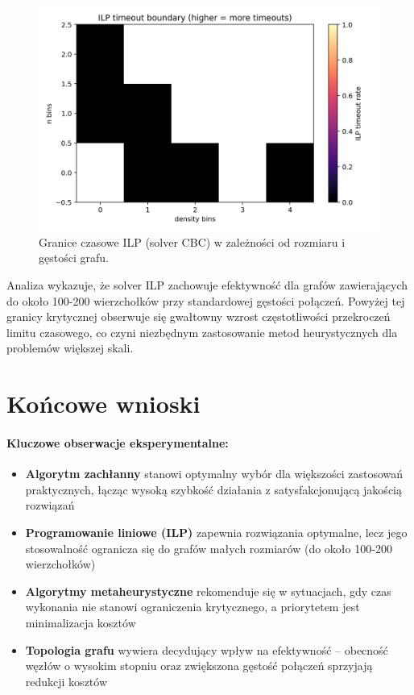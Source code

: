 \begin{figure}[H]
  \centering
  \includegraphics[width=0.7\linewidth]{assets/figures/ba_ilp_timeout_boundary.png}
  \caption{Granice czasowe ILP (solver CBC) w zależności od rozmiaru i gęstości grafu.}
  \label{fig:ilp_limits}
\end{figure}

Analiza wykazuje, że solver ILP zachowuje efektywność dla grafów zawierających do około 100-200 wierzchołków przy standardowej gęstości połączeń. Powyżej tej granicy krytycznej obserwuje się gwałtowny wzrost częstotliwości przekroczeń limitu czasowego, co czyni niezbędnym zastosowanie metod heurystycznych dla problemów większej skali.

\section{Końcowe wnioski}

\paragraph{Kluczowe obserwacje eksperymentalne:}
\begin{itemize}
  \item \textbf{Algorytm zachłanny} stanowi optymalny wybór dla większości zastosowań praktycznych, łącząc wysoką szybkość działania z satysfakcjonującą jakością rozwiązań
  \item \textbf{Programowanie liniowe (ILP)} zapewnia rozwiązania optymalne, lecz jego stosowalność ogranicza się do grafów małych rozmiarów (do około 100-200 wierzchołków)
  \item \textbf{Algorytmy metaheurystyczne} rekomenduje się w sytuacjach, gdy czas wykonania nie stanowi ograniczenia krytycznego, a priorytetem jest minimalizacja kosztów
  \item \textbf{Topologia grafu} wywiera decydujący wpływ na efektywność -- obecność węzłów o wysokim stopniu oraz zwiększona gęstość połączeń sprzyjają redukcji kosztów
\end{itemize}

